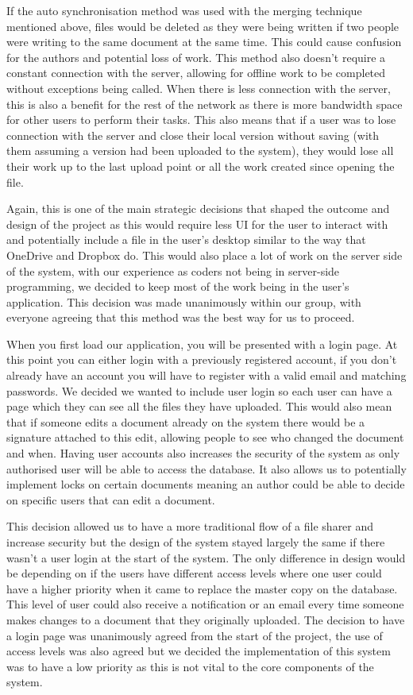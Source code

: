 \documentclass[11pt]{article}
\begin{document}
If the auto synchronisation method was used with the merging technique mentioned above, files would be deleted as they were being written if two people were writing to the same document at the same time. This could cause confusion for the authors and potential loss of work. This method also doesn’t require a constant connection with the server, allowing for offline work to be completed without exceptions being called. When there is less connection with the server, this is also a benefit for the rest of the network as there is more bandwidth space for other users to perform their tasks. This also means that if a user was to lose connection with the server and close their local version without saving (with them assuming a version had been uploaded to the system), they would lose all their work up to the last upload point or all the work created since opening the file. 

Again, this is one of the main strategic decisions that shaped the outcome and design of the project as this would require less UI for the user to interact with and potentially include a file in the user’s desktop similar to the way that OneDrive and Dropbox do. This would also place a lot of work on the server side of the system, with our experience as coders not being in server-side programming, we decided to keep most of the work being in the user’s application. This decision was made unanimously within our group, with everyone agreeing that this method was the best way for us to proceed.

When you first load our application, you will be presented with a login page. At this point you can either login with a previously registered account, if you don’t already have an account you will have to register with a valid email and matching passwords. We decided we wanted to include user login so each user can have a page which they can see all the files they have uploaded. This would also mean that if someone edits a document already on the system there would be a signature attached to this edit, allowing people to see who changed the document and when. Having user accounts also increases the security of the system as only authorised user will be able to access the database. It also allows us to potentially implement locks on certain documents meaning an author could be able to decide on specific users that can edit a document. 

This decision allowed us to have a more traditional flow of a file sharer and increase security but the design of the system stayed largely the same if there wasn’t a user login at the start of the system. The only difference in design would be depending on if the users have different access levels where one user could have a higher priority when it came to replace the master copy on the database. This level of user could also receive a notification or an email every time someone makes changes to a document that they originally uploaded. The decision to have a login page was unanimously agreed from the start of the project, the use of access levels was also agreed but we decided the implementation of this system was to have a low priority as this is not vital to the core components of the system.
\end{document}
